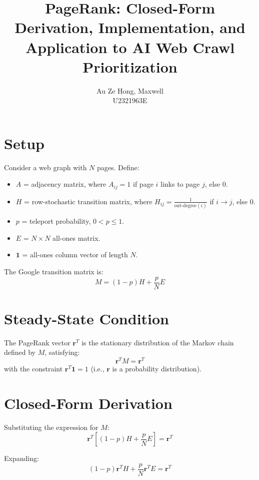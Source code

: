 \documentclass{article}
\title{PageRank: Closed-Form Derivation, Implementation, and\\Application to AI Web Crawl Prioritization}
\author{Au Ze Hong, Maxwell \\ U2321963E}
\date{}
\begin{document}
\maketitle

\section{Setup}

Consider a web graph with $N$ pages. Define:
\begin{itemize}
    \item $A$ = adjacency matrix, where $A_{ij} = 1$ if page $i$ links to page $j$, else $0$.
    \item $H$ = row-stochastic transition matrix, where $H_{ij} = \frac{1}{\text{out-degree}(i)}$ if $i \to j$, else $0$.
    \item $p$ = teleport probability, $0 < p \leq 1$.
    \item $E$ = $N \times N$ all-ones matrix.
    \item $\mathbf{1}$ = all-ones column vector of length $N$.
\end{itemize}

The Google transition matrix is:
\begin{equation}
    M = (1 - p) H + \frac{p}{N} E
\end{equation}

\section{Steady-State Condition}

The PageRank vector $\mathbf{r}^T$ is the stationary distribution of the Markov chain defined by $M$, satisfying:
\begin{equation}
    \mathbf{r}^T M = \mathbf{r}^T
\end{equation}
with the constraint $\mathbf{r}^T \mathbf{1} = 1$ (i.e., $\mathbf{r}$ is a probability distribution).

\section{Closed-Form Derivation}

Substituting the expression for $M$:
\begin{equation}
    \mathbf{r}^T \left[ (1 - p) H + \frac{p}{N} E \right] = \mathbf{r}^T
\end{equation}

Expanding:
\begin{equation}
    (1 - p) \mathbf{r}^T H + \frac{p}{N} \mathbf{r}^T E = \mathbf{r}^T
\end{equation}
\end{document}
